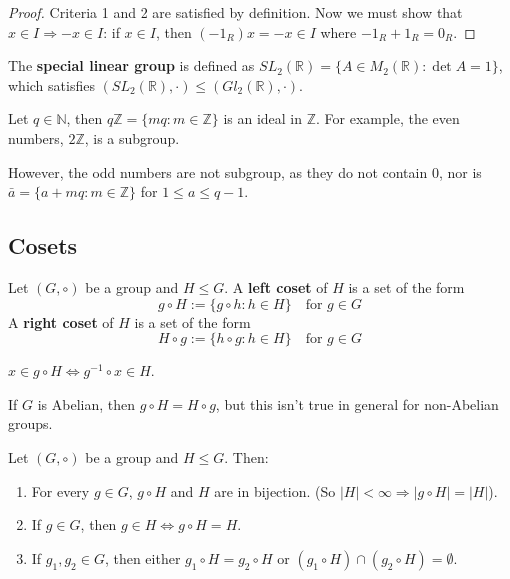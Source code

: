 \begin{proof}
	Criteria 1 and 2 are satisfied by definition. Now we must show that $x \in I \Rightarrow -x \in I$: if $x \in I$, then $(-1_R) x = -x \in I$ where $-1_R + 1_R = 0_R$.
\end{proof}

\begin{definition}
	The \textbf{special linear group} is defined as $SL_2(\mathbb{R}) = \{ A \in M_2(\mathbb{R}): \det A = 1 \}$, which satisfies $(SL_2(\mathbb{R}), \cdot) \le (Gl_2(\mathbb{R}), \cdot)$.
\end{definition}

\begin{example}
	Let $q \in \mathbb{N}$, then $q \mathbb{Z} = \{ m q: m \in \mathbb{Z} \}$ is an ideal in $\mathbb{Z}$. For example, the even numbers, $2 \mathbb{Z}$, is a subgroup.

	However, the odd numbers are not subgroup, as they do not contain $0$, nor is $\bar{a} = \{ a + mq: m \in \mathbb{Z} \}$ for $1 \le a \le q - 1$.
\end{example}

\subsection{Cosets}

\begin{definition}
	Let $(G, \circ)$ be a group and $H \le G$. A \textbf{left coset} of $H$ is a set of the form
	\[
		g \circ H := \{ g \circ h: h \in H \} \quad \text{for } g \in G
	\]
	A \textbf{right coset} of $H$ is a set of the form
	\[
		H \circ g := \{ h \circ g: h \in H \} \quad \text{for } g \in G
	\]
\end{definition}

\begin{remark}
	$x \in g \circ H \Longleftrightarrow g^{-1} \circ x \in H$.
\end{remark}

\begin{remark}
	If $G$ is Abelian, then $g \circ H = H \circ g$, but this isn't true in general for non-Abelian groups.
\end{remark}

\begin{proposition}
	Let $(G, \circ)$ be a group and $H \le G$. Then:
	\begin{enumerate}
		\item For every $g \in G$, $g \circ H$ and $H$ are in bijection. (So $|H| < \infty \Rightarrow |g \circ H| = |H|$).
		\item If $g \in G$, then $g \in H \Longleftrightarrow g \circ H = H$.
		\item If $g_1, g_2 \in G$, then either $g_1 \circ H = g_2 \circ H$ or $(g_1 \circ H) \cap (g_2 \circ H) = \emptyset$.
	\end{enumerate}
\end{proposition}

